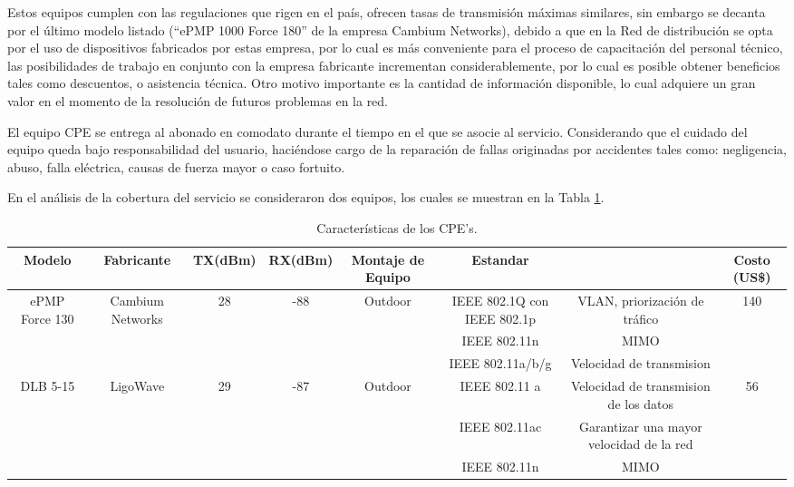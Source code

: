 Estos equipos cumplen con las regulaciones que rigen en el país, ofrecen tasas de transmisión máximas similares, sin embargo se decanta por el último modelo listado (“ePMP 1000 Force 180” de la empresa Cambium Networks), debido a que en la Red de distribución se opta por el uso de dispositivos fabricados por estas empresa, por lo cual es más conveniente para el proceso de capacitación del personal técnico, las posibilidades de trabajo en conjunto con la empresa fabricante incrementan considerablemente, por lo cual es posible obtener beneficios tales como descuentos, o asistencia técnica. Otro motivo importante es la cantidad de información disponible, lo cual adquiere un gran valor en el momento de la resolución de futuros problemas en la red.



El equipo CPE se entrega al abonado en comodato durante el tiempo en el que se asocie al servicio. Considerando que el cuidado del equipo queda bajo responsabilidad del usuario, haciéndose cargo de la reparación de fallas originadas por accidentes tales como: negligencia, abuso, falla eléctrica, causas de fuerza mayor o caso fortuito.

En el análisis de la cobertura del servicio se consideraron dos equipos, los cuales se muestran en la Tabla \ref{tab:caracteristicas-cpe}.


\begin{table}[H]
  \tiny
  \centering
    \begin{tabular}{|c|c|c|c|c|c|c|c|}
    \hline
    \rowcolor[rgb]{ .773,  .851,  .945} \textbf{Modelo} & \textbf{Fabricante} & \textbf{TX(dBm)} & \textbf{RX(dBm)} & \textbf{Montaje de Equipo} & \textbf{Estandar} &       & \textbf{Costo (US\$)} \bigstrut\\
    \hline
    \multirow{3}[6]{*}{ePMP Force 130} & \multirow{3}[6]{*}{Cambium Networks} & \multirow{3}[6]{*}{28} & \multirow{3}[6]{*}{-88} & \multirow{3}[6]{*}{Outdoor} & IEEE 802.1Q con IEEE 802.1p & VLAN, priorización de tráfico  & \multirow{3}[6]{*}{140} \bigstrut\\
\cline{6-7}          &       &       &       &       & IEEE 802.11n & MIMO  &  \bigstrut\\
\cline{6-7}          &       &       &       &       & IEEE 802.11a/b/g & Velocidad de transmision  &  \bigstrut\\
    \hline
    \multirow{3}[6]{*}{ DLB 5-15} & \multirow{3}[6]{*}{LigoWave} & \multirow{3}[6]{*}{29} & \multirow{3}[6]{*}{-87} & \multirow{3}[6]{*}{Outdoor} & IEEE 802.11 a & Velocidad de transmision de los datos  & \multirow{3}[6]{*}{56} \bigstrut\\
\cline{6-7}          &       &       &       &       & IEEE 802.11ac & \textcolor[rgb]{ .125,  .129,  .141}{Garantizar una mayor velocidad de la red} &  \bigstrut\\
\cline{6-7}          &       &       &       &       & IEEE 802.11n & MIMO  &  \bigstrut\\
    \hline
    \end{tabular}%
	\caption{Características de los CPE's.}
  \label{tab:caracteristicas-cpe}%
\end{table}%


